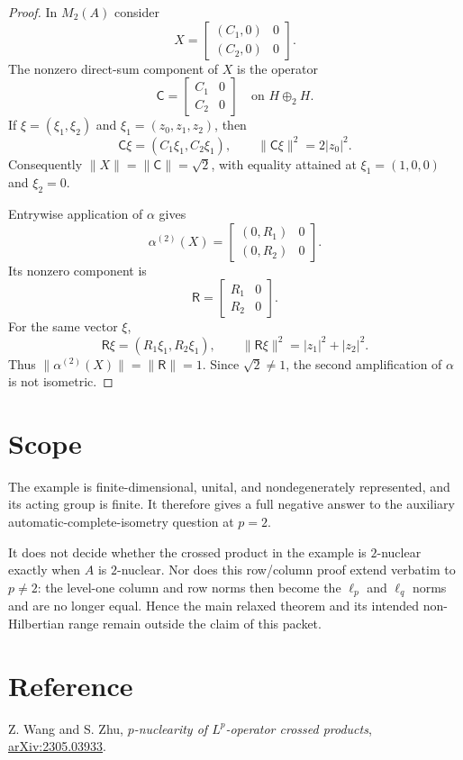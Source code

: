 \documentclass[11pt]{article}
\newcommand{\C}{\mathbb C}
\begin{document}
\begin{proof}
In $M_2(A)$ consider
\[
 X=
 \begin{bmatrix}
  (C_1,0)&0\\
  (C_2,0)&0
 \end{bmatrix}.
\]
The nonzero direct-sum component of $X$ is the operator
\[
 \mathsf C=
 \begin{bmatrix}C_1&0\\C_2&0\end{bmatrix}
 \quad\text{on }H\oplus_2H.
\]
If $\xi=(\xi_1,\xi_2)$ and $\xi_1=(z_0,z_1,z_2)$, then
\[
 \mathsf C\xi=(C_1\xi_1,C_2\xi_1),
 \qquad \|\mathsf C\xi\|^2=2|z_0|^2.
\]
Consequently $\|X\|=\|\mathsf C\|=\sqrt2$, with equality attained at
$\xi_1=(1,0,0)$ and $\xi_2=0$.

Entrywise application of $\alpha$ gives
\[
 \alpha^{(2)}(X)=
 \begin{bmatrix}
  (0,R_1)&0\\
  (0,R_2)&0
 \end{bmatrix}.
\]
Its nonzero component is
\[
 \mathsf R=
 \begin{bmatrix}R_1&0\\R_2&0\end{bmatrix}.
\]
For the same vector $\xi$,
\[
 \mathsf R\xi=(R_1\xi_1,R_2\xi_1),
 \qquad \|\mathsf R\xi\|^2=|z_1|^2+|z_2|^2.
\]
Thus $\|\alpha^{(2)}(X)\|=\|\mathsf R\|=1$.  Since
$\sqrt2\ne1$, the second amplification of $\alpha$ is not isometric.
\end{proof}

\section{Scope}

The example is finite-dimensional, unital, and nondegenerately represented,
and its acting group is finite.  It therefore gives a full negative answer to
the auxiliary automatic-complete-isometry question at $p=2$.

It does not decide whether the crossed product in the example is
$2$-nuclear exactly when $A$ is $2$-nuclear.  Nor does this row/column proof
extend verbatim to $p\ne2$: the level-one column and row norms then become
the $\ell_p$ and $\ell_q$ norms and are no longer equal.  Hence the main
relaxed theorem and its intended non-Hilbertian range remain outside the
claim of this packet.

\section{Reference}

Z. Wang and S. Zhu, \emph{$p$-nuclearity of $L^p$-operator crossed products},
\href{https://arxiv.org/abs/2305.03933}{arXiv:2305.03933}.
\end{document}
